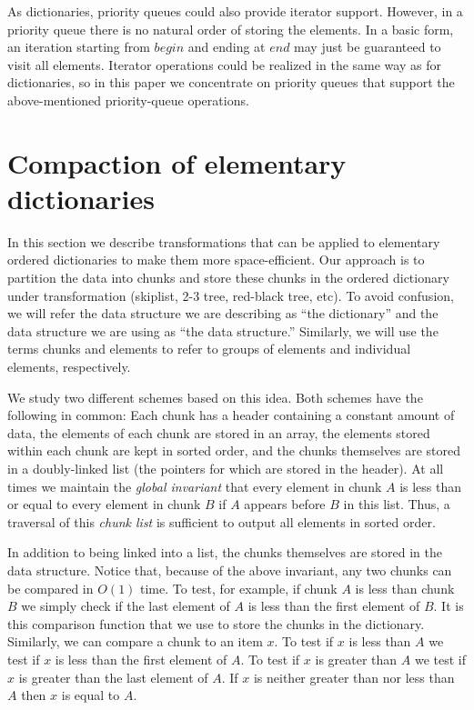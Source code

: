 \documentclass{DIKU-article}
\newcommand{\seclabel}[1]{\label{sec:#1}}
\newcommand{\Begin}{\mbox{$\mathit{begin}$}}
\newcommand{\End}{\mbox{$\mathit{end}$}}
\begin{document}
As dictionaries, priority queues could also provide iterator
support. However, in a priority queue there is no natural order of
storing the elements. In a basic form, an iteration starting from
\Begin{} and ending at \End{} may just be guaranteed to visit all
elements. Iterator operations could be realized in the same way as for
dictionaries, so in this paper we concentrate on priority
queues that support the above-mentioned priority-queue
operations.

\section{Compaction of elementary dictionaries}%
\seclabel{elementary-dictionaries}

In this section we describe transformations that can be applied to
elementary ordered dictionaries to make them more space-efficient.
Our approach is to partition the data into chunks and store these
chunks in the ordered dictionary under transformation (skiplist,
2-3 tree, red-black tree, etc).  To avoid confusion, we will refer the
data structure we are describing as ``the dictionary'' and the data
structure we are using as ``the data structure.''  Similarly, we will
use the terms chunks and elements to refer to groups of elements and
individual elements, respectively.  

We study two different schemes based on this idea.  Both schemes have
the following in common:  Each chunk has a header containing a
constant amount of data, the elements of each chunk are stored in an
array, the elements stored within each chunk are kept in sorted order,
and the chunks themselves are stored in a doubly-linked list (the
pointers for which are stored in the header).  At all times we
maintain the \emph{global invariant} that every element in chunk $A$
is less than or equal to every element in chunk $B$ if $A$ appears
before $B$ in this list.  Thus, a traversal of this \emph{chunk list}
is sufficient to output all elements in sorted order.

In addition to being linked into a list, the chunks themselves are
stored in the data structure.  Notice that, because of the above
invariant, any two chunks can be compared in $O(1)$ time.  To test,
for example, if chunk $A$ is less than chunk $B$ we simply check if
the last element of $A$ is less than the first element of $B$.  It is
this comparison function that we use to store the chunks in the
dictionary.  Similarly, we can compare a chunk to an item $x$.  To
test if $x$ is less than $A$ we test if $x$ is less than the first
element of $A$.  To test if $x$ is greater than $A$ we test if $x$ is
greater than the last element of $A$.  If $x$ is neither greater than
nor less than $A$ then $x$ is equal to $A$.  
\end{document}

